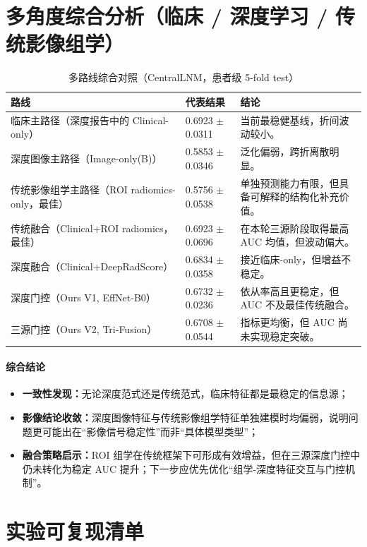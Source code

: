 \documentclass[12pt,a4paper]{ctexart}
\begin{document}
\section{多角度综合分析（临床 / 深度学习 / 传统影像组学）}

\begin{table}[H]
\centering
\caption{多路线综合对照（CentralLNM，患者级 5-fold test）}
\begin{tabular}{p{}p{}p{}}
\toprule
路线 & 代表结果 & 结论 \\
\midrule
临床主路径（深度报告中的 Clinical-only） & 0.6923 $\pm$ 0.0311 & 当前最稳健基线，折间波动较小。 \\
深度图像主路径（Image-only(B)） & 0.5853 $\pm$ 0.0346 & 泛化偏弱，跨折离散明显。 \\
传统影像组学主路径（ROI radiomics-only，最佳） & 0.5756 $\pm$ 0.0538 & 单独预测能力有限，但具备可解释的结构化补充价值。 \\
传统融合（Clinical+ROI radiomics，最佳） & 0.6923 $\pm$ 0.0696 & 在本轮三源阶段取得最高 AUC 均值，但波动偏大。 \\
深度融合（Clinical+DeepRadScore） & 0.6834 $\pm$ 0.0358 & 接近临床-only，但增益不稳定。 \\
深度门控（Ours V1, EffNet-B0） & 0.6732 $\pm$ 0.0236 & 依从率高且更稳定，但 AUC 不及最佳传统融合。 \\
三源门控（Ours V2, Tri-Fusion） & 0.6708 $\pm$ 0.0544 & 指标更均衡，但 AUC 尚未实现稳定突破。 \\
\bottomrule
\end{tabular}
\end{table}

\paragraph{综合结论}
\begin{itemize}
  \item \textbf{一致性发现：}无论深度范式还是传统范式，临床特征都是最稳定的信息源；
  \item \textbf{影像结论收敛：}深度图像特征与传统影像组学特征单独建模时均偏弱，说明问题更可能出在“影像信号稳定性”而非“具体模型类型”；
  \item \textbf{融合策略启示：}ROI 组学在传统框架下可形成有效增益，但在三源深度门控中仍未转化为稳定 AUC 提升；下一步应优先优化“组学-深度特征交互与门控机制”。
\end{itemize}

\section{实验可复现清单}
\end{document}
